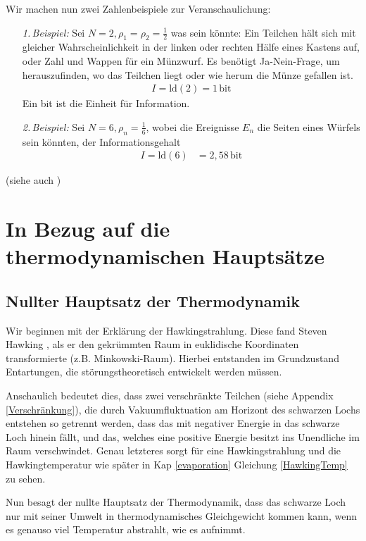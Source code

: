 \documentclass[ngerman]{scrartcl}
\begin{document}
Wir machen nun zwei Zahlenbeispiele zur Veranschaulichung:
	\begin{itemize}
		\item[\textit{1.\,Beispiel:}] Sei $N=2, \rho_1 = \rho_2= \frac{1}{2}$ was sein könnte: Ein Teilchen hält sich mit gleicher Wahrscheinlichkeit in der linken oder rechten Hälfe eines Kastens auf, oder Zahl und Wappen für ein Münzwurf.
		Es benötigt Ja-Nein-Frage, um herauszufinden, wo das Teilchen liegt oder wie herum die Münze gefallen ist.
			\begin{align*}
				I = \mathrm{ld}(2) = 1 \,\mathrm{bit}
			\end{align*}
		Ein bit ist die Einheit für Information.
		\item[\textit{2.\,Beispiel:}]Sei $N=6, \rho_n = \frac{1}{6}$, wobei die Ereignisse $E_n$ die Seiten eines Würfels sein könnten, der Informationsgehalt
			\begin{align*}
				I = \mathrm{ld}(6) &= 2,58 \,\mathrm{bit}
			\end{align*}
	\end{itemize}
(siehe auch \cite{Brenig})

\section{In Bezug auf die thermodynamischen Hauptsätze}
	\subsection{Nullter Hauptsatz der Thermodynamik}
	Wir beginnen mit der Erklärung der Hawkingstrahlung. Diese fand Steven Hawking \cite{ParticleCreation}, als er den gekrümmten Raum in euklidische Koordinaten transformierte (z.B. Minkowski-Raum). Hierbei entstanden im Grundzustand Entartungen, die störungstheoretisch entwickelt werden müssen. 
	
	Anschaulich bedeutet dies, dass zwei verschränkte Teilchen (siehe Appendix \ref{Verschränkung}), die durch Vakuumfluktuation am Horizont des schwarzen Lochs entstehen so getrennt werden, dass das mit negativer Energie in das schwarze Loch hinein fällt, und das, welches eine positive Energie besitzt ins Unendliche im Raum verschwindet. 
	Genau letzteres sorgt für eine Hawkingstrahlung und die Hawkingtemperatur wie später in Kap \ref{evaporation} Gleichung \eqref{HawkingTemp} zu sehen.
	
	Nun besagt der nullte Hauptsatz der Thermodynamik, dass das schwarze Loch nur mit seiner Umwelt in thermodynamisches Gleichgewicht kommen kann, wenn es genauso viel Temperatur abstrahlt, wie es aufnimmt. 
	
\end{document}
